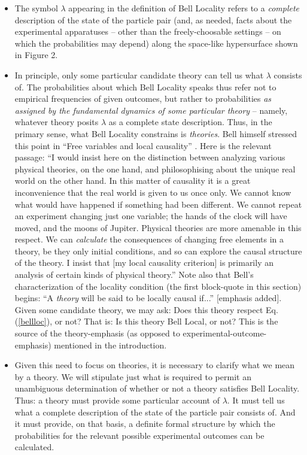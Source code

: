 \documentclass[aps,prc,onecolumn,12pt,nofootinbib]{revtex4-2}
\begin{document}
\begin{itemize}

\item The symbol $\lambda$ appearing in the definition of Bell
  Locality refers to a \emph{complete} description of the state of the
  particle pair (and, as needed, facts about the experimental apparatuses
  -- other than the freely-choosable settings -- on which the probabilities may
  depend) along the space-like hypersurface shown in Figure 2.

\item  In
  principle, only some particular candidate theory can tell us what
  $\lambda$ consists of.  The probabilities about which Bell Locality
  speaks thus refer
  not to empirical frequencies of given outcomes, but rather to
  probabilities \emph{as assigned by the fundamental dynamics of
  some particular theory} -- namely, whatever theory posits $\lambda$
  as a complete state description.  Thus, in the
  primary sense, what Bell Locality constrains is \emph{theories}.
Bell himself stressed this point in ``Free variables and local
  causality'' \cite[pg 100-104]{bell}.  Here is the relevant passage:
``I would insist here on the
distinction between analyzing various physical theories, on the one
hand, and philosophising about the unique real world on the other
hand.  In this matter of causality it is a great inconvenience that
the real world is given to us once only.  We cannot know what would
have happened if something had been different.  We cannot repeat an
experiment changing just one variable; the hands of the clock will
have moved, and the moons of Jupiter.  Physical theories are more
amenable in this respect.  We can \emph{calculate} the consequences of
changing free elements in a theory, be they only initial conditions,
and so can explore the causal structure of the theory.  I insist that
[my local causality criterion] is primarily an analysis of certain kinds
of physical theory.''  Note also that Bell's characterization of the
  locality condition (the first block-quote in this section)
  begins:  ``A \emph{theory} will be
  said to be locally causal if...'' [emphasis added].
  Given some candidate theory, we may ask:  Does this theory
  respect Eq. (\ref{bellloc}), or not?  That is:  Is this theory
  Bell Local, or not?  This is the source of the theory-emphasis (as
  opposed to experimental-outcome-emphasis) mentioned in the
  introduction.

\item  Given this need to focus on theories, it is necessary to
  clarify what we mean by a theory.  We will stipulate just
  what is required to permit an unambiguous determination of whether or
  not a theory satisfies Bell Locality.  Thus:  a theory must
  provide some particular account of $\lambda$.  It must tell us what
  a complete description of the state of the particle pair consists
  of.  And it must provide, on that basis,
  a definite formal structure by which the
  probabilities for the relevant possible experimental outcomes can be
  calculated.

\end{itemize}
\end{document}
